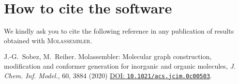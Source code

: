 \documentclass[]{tufte-book}
\begin{document}
\chapter{How to cite the software}

We kindly ask you to cite the following reference in any publication of results
obtained with \textsc{Molassembler}.

\vspace{1cm}

J.-G.~Sobez, M.~Reiher. Molassembler: Molecular graph construction, modification
and conformer generation for inorganic and organic molecules, \textit{J. Chem. Inf.
Model.}, 60, 3884 (2020) \href{https://doi.org/10.1021/acs.jcim.0c00503}{DOI:
\texttt{10.1021/acs.jcim.0c00503}}.




\backmatter




\end{document}
